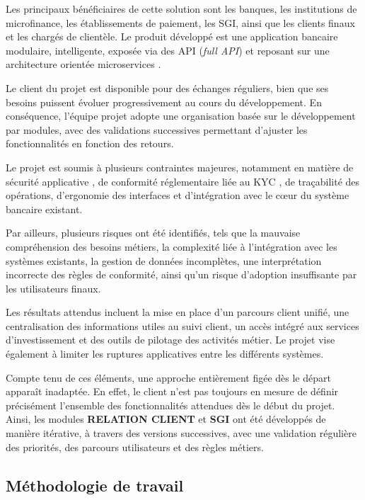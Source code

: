 \documentclass[a4paper,12pt]{report}
\begin{document}
Les principaux bénéficiaires de cette solution sont les banques, les institutions de microfinance, les établissements de paiement, les SGI, ainsi que les clients finaux et les chargés de clientèle. Le produit développé est une application bancaire modulaire, intelligente, exposée via des API (\textit{full API}) et reposant sur une architecture orientée microservices \cite{fowler_microservices}.

Le client du projet est disponible pour des échanges réguliers, bien que ses besoins puissent évoluer progressivement au cours du développement. En conséquence, l'équipe projet adopte une organisation basée sur le développement par modules, avec des validations successives permettant d'ajuster les fonctionnalités en fonction des retours.

Le projet est soumis à plusieurs contraintes majeures, notamment en matière de sécurité applicative \cite{owasp_asvs}, de conformité réglementaire liée au KYC \cite{fatf_digital_id}, de traçabilité des opérations, d'ergonomie des interfaces et d'intégration avec le cœur du système bancaire existant.

Par ailleurs, plusieurs risques ont été identifiés, tels que la mauvaise compréhension des besoins métiers, la complexité liée à l'intégration avec les systèmes existants, la gestion de données incomplètes, une interprétation incorrecte des règles de conformité, ainsi qu'un risque d'adoption insuffisante par les utilisateurs finaux.

Les résultats attendus incluent la mise en place d'un parcours client unifié,
une centralisation des informations utiles au suivi client, un accès intégré aux
services d'investissement et des outils de pilotage des activités métier. Le
projet vise également à limiter les ruptures applicatives entre les différents
systèmes.

Compte tenu de ces éléments, une approche entièrement figée dès le départ apparaît inadaptée. En effet, le client n'est pas toujours en mesure de définir précisément l'ensemble des fonctionnalités attendues dès le début du projet. Ainsi, les modules \textbf{RELATION CLIENT} et \textbf{SGI} ont été développés de manière itérative, à travers des versions successives, avec une validation régulière des priorités, des parcours utilisateurs et des règles métiers.


\subsection{Méthodologie de travail}
\end{document}
